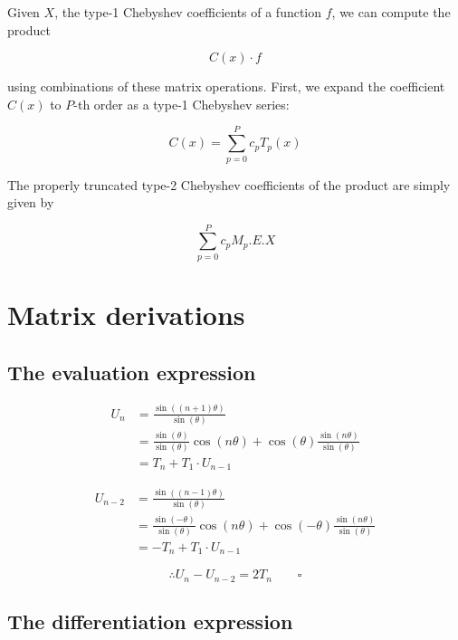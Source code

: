 \documentclass{article}
\begin{document}
Given $X$, the type-1 Chebyshev coefficients of a function $f$, we can compute the product

\begin{equation*}
C(x) \cdot f
\end{equation*}

\noindent using combinations of these matrix operations.  First, we expand the coefficient $C(x)$ to $P$-th order as a type-1 Chebyshev series:

\begin{equation*}
C(x) = \sum_{p=0}^P c_p T_p(x)
\end{equation*}

The properly truncated type-2 Chebyshev coefficients of the product are simply given by

\begin{equation}
\sum_{p=0}^P c_p M_p.E.X
\end{equation}


\section{Matrix derivations}

\subsection{The evaluation expression}\label{deriv_eval}

\begin{align*}
U_n &= \frac{\sin((n+1) \theta)}{\sin(\theta)} \\
&= \frac{\sin(\theta)}{\sin(\theta)} \cos(n \theta) + \cos(\theta) \frac{\sin(n \theta)}{\sin(\theta)} \\
&= T_n + T_1 \cdot U_{n-1}
\end{align*}

\begin{align*}
U_{n-2} &= \frac{\sin((n-1) \theta)}{\sin(\theta)} \\
&= \frac{\sin(-\theta)}{\sin(\theta)} \cos(n \theta) + \cos(-\theta) \frac{\sin(n \theta)}{\sin(\theta)} \\
&= -T_n + T_1 \cdot U_{n-1}
\end{align*}

\begin{equation*}
\therefore U_n - U_{n-2} = 2 T_n \quad \quad \square
\end{equation*}
    
\subsection{The differentiation expression}\label{deriv_diff}
\end{document}
